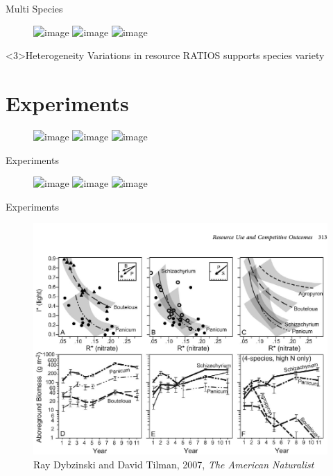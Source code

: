 \documentclass[final,xcolor=dvipsnames]{beamer}
\begin{document}
\begin{frame}{Multi Species}
\begin{figure}
       \includegraphics<1>[width=.6\framewidth]{5Species}
       \includegraphics<2>[width=.6\framewidth]{RessourceGradients3}
       \includegraphics<3>[width=.5\framewidth]{5Species}
    \end{figure}
    \begin{block}<3>{Heterogeneity}
    Variations in resource RATIOS supports species variety
    \end{block}
\end{frame}

\section{Experiments}

\begin{frame}
\begin{figure}
       \includegraphics<1>[width=.8\framewidth]{MillerCitation}
       \includegraphics<2>[width=.45\framewidth]{Miller1}
        \includegraphics<2>[width=.45\framewidth]{Miller2}
\end{figure}
\end{frame}

\begin{frame}{Experiments}
\begin{figure}
       \includegraphics<1>[width=.6\framewidth]{TilTest1}
       \includegraphics<2>[width=.8\framewidth]{TilTest0}
       \includegraphics<3>[width=.8\framewidth]{TilTest3}
    \end{figure}
\end{frame}

\begin{frame}{Experiments}
\begin{figure}
       \includegraphics[width=.8\framewidth]{RealCase1}
       \caption{Ray Dybzinski and David Tilman, 2007,\textit{ The American Naturalist}
}
    \end{figure}
\end{frame}
\end{document}
